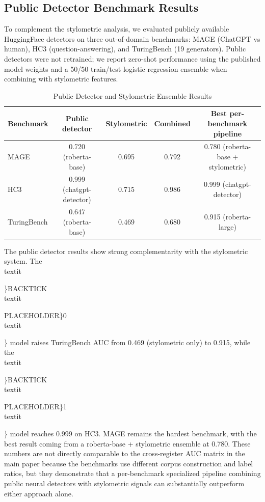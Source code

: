 \documentclass{article}
\begin{document}
{{{{{{\subsection{Public Detector Benchmark Results}

To complement the stylometric analysis, we evaluated publicly available HuggingFace detectors on three out-of-domain benchmarks: MAGE (ChatGPT vs human), HC3 (question-answering), and TuringBench (19 generators). Public detectors were not retrained; we report zero-shot performance using the published model weights and a 50/50 train/test logistic regression ensemble when combining with stylometric features.


\begin{table}[H]
\centering
\small
\begin{tabular}{lcccc}
\toprule
\textbf{Benchmark} & \textbf{Public detector} & \textbf{Stylometric} & \textbf{Combined} & \textbf{Best per-benchmark pipeline} \\
\midrule
MAGE & 0.720 (roberta-base) & 0.695 & 0.792 & 0.780 (roberta-base + stylometric) \\
HC3 & 0.999 (chatgpt-detector) & 0.715 & 0.986 & 0.999 (chatgpt-detector) \\
TuringBench & 0.647 (roberta-base) & 0.469 & 0.680 & 0.915 (roberta-large) \\
\bottomrule
\end{tabular}
\caption{Public Detector and Stylometric Ensemble Results}
\end{table}

The public detector results show strong complementarity with the stylometric system. The \\textit{\}BACKTICK\\textit{PLACEHOLDER\}0\\textit{\} model raises TuringBench AUC from 0.469 (stylometric only) to 0.915, while the \\textit{\}BACKTICK\\textit{PLACEHOLDER\}1\\textit{\} model reaches 0.999 on HC3. MAGE remains the hardest benchmark, with the best result coming from a roberta-base + stylometric ensemble at 0.780. These numbers are not directly comparable to the cross-register AUC matrix in the main paper because the benchmarks use different corpus construction and label ratios, but they demonstrate that a per-benchmark specialized pipeline combining public neural detectors with stylometric signals can substantially outperform either approach alone.

}}}}}}}}}}}}
\end{document}
